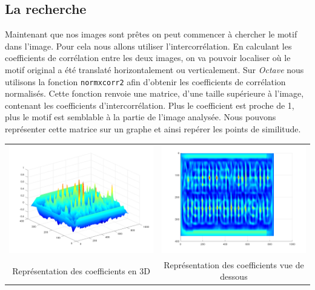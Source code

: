 \documentclass[a4paper,12pt,titlepage]{report}
\newcommand{\octave}{\textit{Octave }}
\begin{document}
	\subsection{La recherche}
	Maintenant que nos images sont prêtes on peut commencer à chercher le motif dans l'image. Pour cela nous allons utiliser l'intercorrélation. En calculant les coefficients de corrélation entre les deux images, on va pouvoir localiser où le motif original a été translaté horizontalement ou verticalement.
	Sur \octave nous utilisons la fonction \texttt{normxcorr2} afin d'obtenir les coefficients de corrélation normalisés. Cette fonction renvoie une matrice, d'une taille supérieure à l'image, contenant les coefficients d'intercorrélation. Plus le coefficient est proche de 1, plus le motif est semblable à la partie de l'image analysée.
	Nous pouvons représenter cette matrice sur un graphe et ainsi repérer les points de similitude.
	
	\begin{center}
		\begin{tabular}{cc}
			\includegraphics[scale=0.19]{illus/cor.png} & \includegraphics[scale=0.19]{illus/cor1.png}\\
			Représentation des coefficients en 3D  & Représentation des coefficients vue de dessous\\
		\end{tabular}
	\end{center}
	
\end{document}
